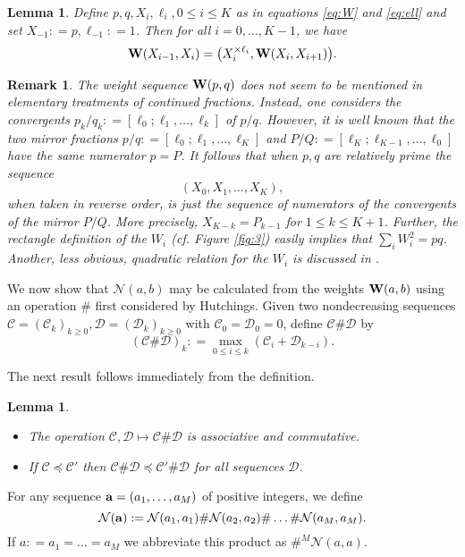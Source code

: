 \documentclass[11pt]{amsart}
\newcommand{\labell}[1] {\label{#1}}
\newcommand{\1}{{{\mathchoice {\rm 1\mskip-4mu l} {\rm 1\mskip-4mu l}
{\rm 1\mskip-4.5mu l} {\rm 1\mskip-5mu l}}}}
\newcommand{\ba} {{\bf a}}
\newcommand{\bW} {{\bf W}}
\newcommand{\Cc}{{\mathcal C}}
\newcommand{\Nn}{{\mathcal N}}
\newcommand{\Dd}{{\mathcal D}}
\newtheorem{lemma}[theorem]{Lemma}
\newtheorem{rmk}[theorem]{Remark}
\numberwithin{figure}{section}
\numberwithin{equation}{section}
\begin{document}
 \begin{lemma}\labell{le:W} Define $p,q, X_i, \ell_i, 0\le i\le K$ as in equations \eqref{eq:W} and \eqref{eq:ell} and set $X_{-1}: = p, \ell_{-1}: = 1$.  Then for all $i=0,\dots,K-1$, we have
 $$
  \bW(X_{i-1}, X_i) = \bigl(X_i^{\times \ell_i}, \bW(X_i, X_{i+1})\bigr).
  $$
  \end{lemma}
  
  \begin{rmk}\rm  
  The weight sequence $\bW(p,q)$ does not seem to be mentioned in elementary treatments of continued fractions. Instead, one considers
  the convergents $p_k/q_k: = [\ell_0;\ell_1,\dots,\ell_k]$ of $p/q$. However, 
it is well known that the two mirror  fractions 
  $p/q: = [\ell_0;\ell_1,\dots,\ell_K]$ and $P/Q: = [\ell_K;\ell_{K-1},\dots,\ell_0]$
  have the same numerator $p=P$. 
  It follows that when $p,q$ are relatively prime the sequence
  $$
  (X_0,X_1,\dots,X_K),
  $$
  when taken in reverse order, is just
  the sequence of numerators of the convergents  of the mirror $P/Q$.
  More precisely, $X_{K-k} =P_{k-1}$ for $1\le k \le K+1$.  Further,  the rectangle definition of the $W_i$ 
  (cf. Figure \ref{fig:3}) easily implies
  that $\sum_i W_i^2 = pq$.  Another, less obvious, quadratic relation for the $W_i$ is discussed in \cite[\S2.2]{MS}.
  \end{rmk}
  
 We now show that $\Nn(a,b)$ may be calculated 
 from the weights $\bW(a,b)$ using an operation $\#$ first considered by Hutchings.
 Given two nondecreasing 
 sequences $\Cc=(\Cc_k)_{k\ge 0}, \Dd=(\Dd_k)_{k\ge 0}$ with $\Cc_0=\Dd_0 = 0$,
 define $\Cc\# \Dd$ by
 $$
 (\Cc\#\Dd)_k: = \max_{0\le i\le k} (\Cc_i + \Dd_{k-i}).
 $$
 
 The next result follows immediately from the definition.
 
 \begin{lemma}\labell{le:assoc}  \begin{itemize}\item[(i)] The operation $\Cc,\Dd\mapsto \Cc\#\Dd$ is  associative and commutative.  
 \item[(ii)] If $\Cc\preccurlyeq \Cc'$ then $\Cc\#\Dd \preccurlyeq \Cc'\#\Dd$  for all sequences $\Dd$.
 \end{itemize}
 \end{lemma}
 
  For any sequence $\ba=(a_1, \dots,a_M)$ of positive integers, we define
  $$
  \Nn(\ba): = \Nn(a_1,a_1)\# \Nn(a_2,a_2)\#\dots \#\Nn(a_M,a_M).
  $$
  If $a: = a_1=\dots = a_M$ we abbreviate this product as $\#^M \Nn(a,a)$.
  
\end{document}
